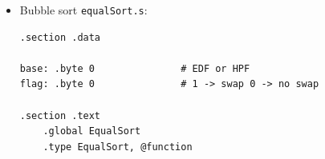 \documentclass[a4paper]{report}
\begin{document}
\begin{itemize}
\begin{lstlisting}[firstnumber=130]
    movl 8(%ebp), %edi # edi = Arr[fine]
    movl 12(%ebp), %esi # esi = Arr[inizio]
    movl 16(%ebp), %ecx # Metodo di sorting (+3 Priorità, +2 Scadenza)

    popl %ebp

    movl %ecx, base

    xorl %ecx, %ecx # i = 0
    xorl %edx, %edx # j = 0
    addl base, %ecx # %ecx punta alla priorità/scadenza 
    addl $4, %ecx  # %punta a 2 oggetto (1)

for:

    cmpl %ecx, %edi
    jle endFor

    movl (%esi, %ecx, 1), %eax
    movb %al, key 
    subl base, %ecx
    movl (%esi, %ecx, 1), %eax
    push %eax
    addl base, %ecx

    movl %ecx, %edx # j = i
    addl $-4, %edx # j = i - 1

while:

    cmpl $0, %edx
    jl PrepEndWhile

    movb (%esi,%edx,1), %al

    cmpb %al, key
    jg PrepEndWhile

    subl base, %edx
    movl %edx, %eax
    addl $4, %eax
    movl (%esi ,%edx,1), %ebx
    movl %ebx, (%esi ,%eax,1)
    decl %edx

    cmpl $3, base
    je while

    decl %edx

    jmp while

PrepEndWhile:

    incl %edx

    cmpl $3, base
    je endWhile

    incl %edx

endWhile:

    popl %eax
    movl %eax, (%esi ,%edx, 1)

    addl $4, %ecx

    jmp for

endFor:

    ret
    \end{lstlisting}
    
    \item Bubble sort \texttt{equalSort.s}:
    
    \begin{lstlisting}[firstnumber=130]
      .section .data

base: .byte 0               # EDF or HPF
flag: .byte 0               # 1 -> swap 0 -> no swap

.section .text
    .global EqualSort
    .type EqualSort, @function


\end{lstlisting}
\end{itemize}
\end{document}
